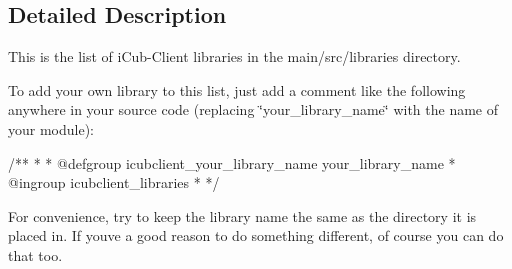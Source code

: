 \subsection{Detailed Description}
This is the list of i\+Cub-\/\+Client libraries in the main/src/libraries directory. 

To add your own library to this list, just add a comment like the following anywhere in your source code (replacing \char`\"{}your\+\_\+library\+\_\+name\char`\"{} with the name of your module)\+: \begin{DoxyVerb}  /**
   *
   * @defgroup icubclient_your_library_name your_library_name
   * @ingroup icubclient_libraries
   *
   */
\end{DoxyVerb}


For convenience, try to keep the library name the same as the directory it is placed in. If you\textquotesingle{}ve a good reason to do something different, of course you can do that too. 